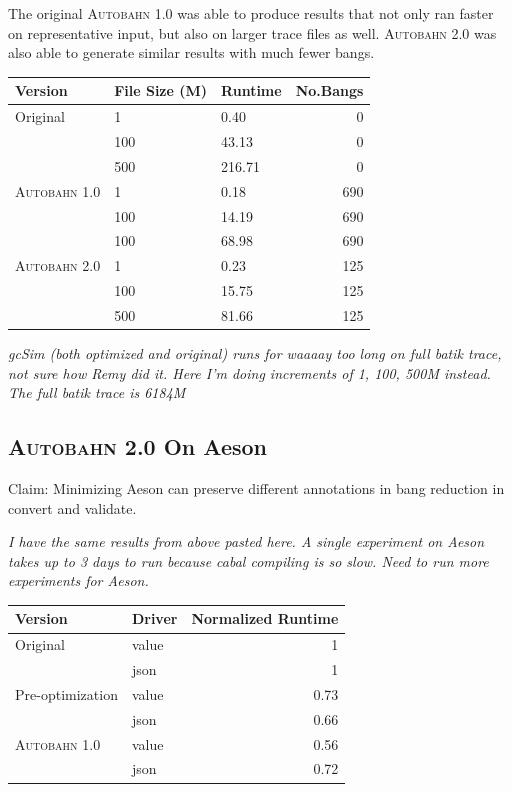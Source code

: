 \documentclass[format=sigplan, review=true]{acmart}
\newcommand{\Ao}[0]{\textsc{Autobahn 1.0}}
\newcommand{\At}[0]{\textsc{Autobahn 2.0}}
\begin{document}
The original \Ao{} was able to produce results that not only ran faster on representative input, but also on larger trace files as well. \At{} was also able to generate similar results with much fewer bangs. 

\begin{tabular}{lllr}
\hline
Version   & File Size (M) & Runtime & No.Bangs \\
\hline
Original      & 1   &   0.40	 & 0   \\
          & 100        & 43.13      & 0 \\
       & 500     &  216.71 & 0 \\
\Ao{}       & 1     & 0.18    &  690\\
          & 100        & 14.19 &  690\\
                 & 100        & 68.98	& 690\\
\At{}      & 1   &  0.23 & 125    \\
          & 100        & 15.75 & 125      \\
       & 500    & 81.66 & 125    \\

\hline
\end{tabular}

\textit{gcSim (both optimized and original) runs for waaaay too long on full batik trace, not sure how Remy did it. Here I'm doing increments of 1, 100, 500M instead. The full batik trace is 6184M}
 
\subsection{\At{} On Aeson}
 
Claim: Minimizing Aeson can preserve different annotations in bang reduction in convert and validate.

\textit{I have the same results from above pasted here. A single experiment on Aeson takes up to 3 days to run because cabal compiling is so slow. Need to run more experiments for Aeson.}

\begin{tabular}{llr}
\hline
Version   & Driver & Normalized Runtime \\
\hline
Original      & value   & 1     \\
          & json        & 1      \\
Pre-optimization       & value     & 0.73     \\
          & json        & 0.66	\\
\Ao{}       & value     & 0.56      \\
          & json        & 0.72	\\

\hline
\end{tabular}
\end{document}
